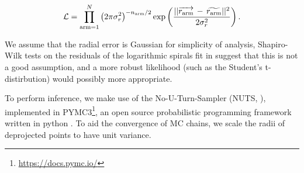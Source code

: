 \begin{equation}
  \mathcal{L} = \prod_{\mathrm{arm}=1}^{N}\left(2\pi\sigma_r^2\right)^{-n_\mathrm{arm}/2}
  \exp\left(\frac{||\overrightarrow{r_\mathrm{arm}}\,-\,\widetilde{r_\mathrm{arm}}||^2}{2\sigma_r^2}\right).
\end{equation}

We assume that the radial error is Gaussian for simplicity of analysis, Shapiro-Wilk tests on the residuals of the logarithmic spirals fit in {\Lingard} suggest that this is not a good assumption, and a more robust likelihood (such as the Student's t-distirbution) would possibly more appropriate.

To perform inference, we make use of the No-U-Turn-Sampler (NUTS, \citealt{2011arXiv1111.4246H}), implemented in PYMC3\footnote{\url{https://docs.pymc.io/}}, an open source probabilistic programming framework written in python \citep{pymc3_paper}. To aid the convergence of MC chains, we scale the radii of deprojected points to have unit variance.

